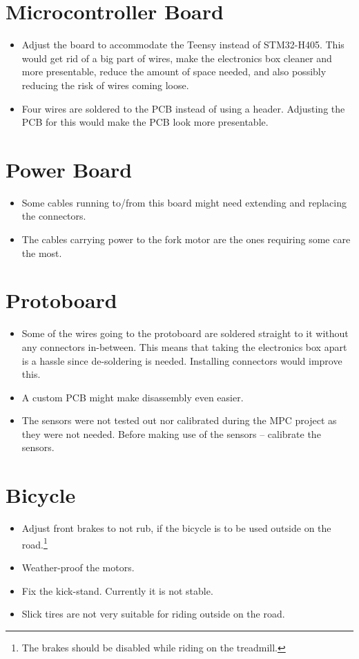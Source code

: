 \section{Microcontroller Board}
\begin{itemize}[noitemsep]
  \item Adjust the board to accommodate the Teensy instead of STM32-H405. This would get rid of a big part of wires, make the electronics box cleaner and more presentable, reduce the amount of space needed, and also possibly reducing the risk of wires coming loose.
  \item Four wires are soldered to the PCB instead of using a header. Adjusting the PCB for this would make the PCB look more presentable.
\end{itemize}

\section{Power Board}
\begin{itemize}[noitemsep]
  \item Some cables running to/from this board might need extending and replacing the connectors.
  \item The cables carrying power to the fork motor are the ones requiring some care the most.
\end{itemize}

\section{Protoboard}
\begin{itemize}[noitemsep]
  \item Some of the wires going to the protoboard are soldered straight to it without any connectors in-between. This means that taking the electronics box apart is a hassle since de-soldering is needed. Installing connectors would improve this.
  \item A custom PCB might make disassembly even easier.
  \item The sensors were not tested out nor calibrated during the MPC project as they were not needed. Before making use of the sensors -- calibrate the sensors.
\end{itemize}

\section{Bicycle}
\begin{itemize}[noitemsep]
  \item Adjust front brakes to not rub, if the bicycle is to be used outside on the road.\footnote{The brakes should be disabled while riding on the treadmill.}
  \item Weather-proof the motors.
  \item Fix the kick-stand. Currently it is not stable.
  \item Slick tires are not very suitable for riding outside on the road.
\end{itemize}
